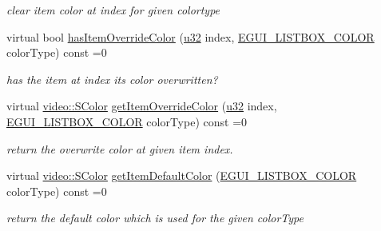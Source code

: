 \begin{DoxyCompactItemize}
\begin{DoxyCompactList}\small\item\em clear item color at index for given colortype \end{DoxyCompactList}\item 
\mbox{\label{classirr_1_1gui_1_1IGUIListBox_a8399578154c3cbfcdd23f3b7009c448d}} 
virtual bool \hyperlink{classirr_1_1gui_1_1IGUIListBox_a8399578154c3cbfcdd23f3b7009c448d}{has\+Item\+Override\+Color} (\hyperlink{namespaceirr_a0416a53257075833e7002efd0a18e804}{u32} index, \hyperlink{namespaceirr_1_1gui_a7da705f0a0b4aa5385e6842adf409cb6}{E\+G\+U\+I\+\_\+\+L\+I\+S\+T\+B\+O\+X\+\_\+\+C\+O\+L\+OR} color\+Type) const =0
\begin{DoxyCompactList}\small\item\em has the item at index its color overwritten? \end{DoxyCompactList}\item 
\mbox{\label{classirr_1_1gui_1_1IGUIListBox_a504c669eae86307521b643288c4ef196}} 
virtual \hyperlink{classirr_1_1video_1_1SColor}{video\+::\+S\+Color} \hyperlink{classirr_1_1gui_1_1IGUIListBox_a504c669eae86307521b643288c4ef196}{get\+Item\+Override\+Color} (\hyperlink{namespaceirr_a0416a53257075833e7002efd0a18e804}{u32} index, \hyperlink{namespaceirr_1_1gui_a7da705f0a0b4aa5385e6842adf409cb6}{E\+G\+U\+I\+\_\+\+L\+I\+S\+T\+B\+O\+X\+\_\+\+C\+O\+L\+OR} color\+Type) const =0
\begin{DoxyCompactList}\small\item\em return the overwrite color at given item index. \end{DoxyCompactList}\item 
\mbox{\label{classirr_1_1gui_1_1IGUIListBox_ae755a88721a458b3255df08519b72e85}} 
virtual \hyperlink{classirr_1_1video_1_1SColor}{video\+::\+S\+Color} \hyperlink{classirr_1_1gui_1_1IGUIListBox_ae755a88721a458b3255df08519b72e85}{get\+Item\+Default\+Color} (\hyperlink{namespaceirr_1_1gui_a7da705f0a0b4aa5385e6842adf409cb6}{E\+G\+U\+I\+\_\+\+L\+I\+S\+T\+B\+O\+X\+\_\+\+C\+O\+L\+OR} color\+Type) const =0
\begin{DoxyCompactList}\small\item\em return the default color which is used for the given color\+Type \end{DoxyCompactList}\item 

\end{DoxyCompactItemize}

